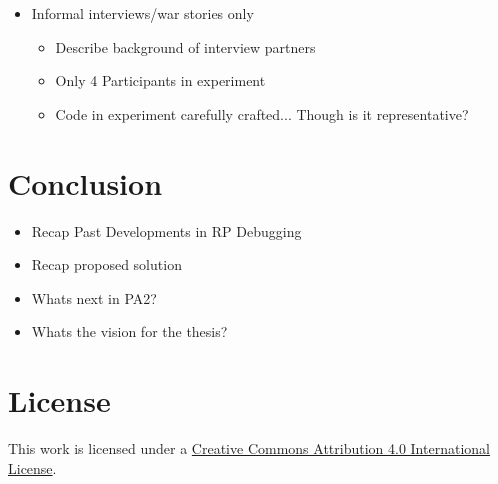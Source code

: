 \documentclass[12pt,a4paper]{article}
\begin{document}
\begin{itemize}
	\item Informal interviews/war stories only
	\begin{itemize}
		\item Describe background of interview partners
		\item Only 4 Participants in experiment
		\item Code in experiment carefully crafted... Though is it representative?
		\
	\end{itemize}
\end{itemize}

\section{Conclusion}
\label{sec:conclusion}

\begin{itemize}
	\item Recap Past Developments in RP Debugging
	\item Recap proposed solution
	\item Whats next in PA2?
	\item Whats the vision for the thesis?
\end{itemize}





\section*{License}
\ccby\thinspace\thinspace This work is licensed under a \href{https://creativecommons.org/licenses/by/4.0/}{Creative Commons Attribution 4.0 International License}.
\end{document}
